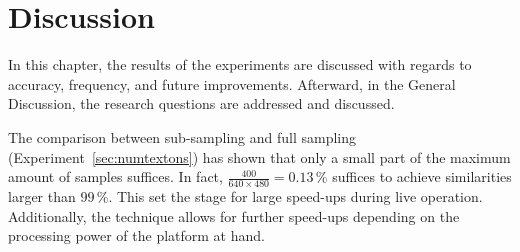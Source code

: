 \chapter{Discussion}
\label{chap:discussion}

In this chapter, the results of the experiments are discussed with regards to accuracy, frequency, and future improvements. Afterward, in the General Discussion, the research questions are addressed and discussed.

The comparison between sub-sampling and full sampling (Experiment~\ref{sec:numtextons}) has shown that only a small part of the maximum amount of
samples suffices. In fact, $\frac{400}{640 \times 480} = 0.13\,\%$ suffices to achieve similarities larger than $99\,\%$. This set the stage for
large speed-ups during live operation. Additionally, the technique allows for further speed-ups depending on the processing power of the platform at hand.

